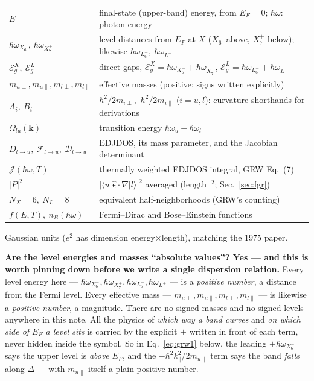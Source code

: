 \documentclass[11pt,a4paper]{article}
\numberwithin{equation}{section}
\newcommand{\hw}{\hbar\omega}
\newcommand{\EgX}{\mathcal{E}_g^{X}}
\newcommand{\EgL}{\mathcal{E}_g^{L}}
\newcommand{\cD}{\mathcal{D}}
\newcommand{\cF}{\mathcal{F}}
\newcommand{\cJ}{\mathcal{J}}%
\newcommand{\kpar}{k_{\parallel}}
\newcommand{\wXsix}{\hbar\omega_{X_6^-}}
\newcommand{\wXseven}{\hbar\omega_{X_7^+}}
\newcommand{\wLsix}{\hbar\omega_{L_6^-}}
\newcommand{\wLplus}{\hbar\omega_{L^+}}
\begin{document}
\begin{center}
\small
\begin{tabular}{ll}
\toprule
$E$ & final-state (upper-band) energy, from $E_F=0$; $\hw$: photon energy\\
$\wXsix,\ \wXseven$ & level distances from $E_F$ at $X$
  ($X_6^-$ above, $X_7^+$ below); likewise $\wLsix,\ \wLplus$\\
$\EgX,\ \EgL$ & direct gaps, $\EgX=\wXsix+\wXseven$,
  $\EgL=\wLsix+\wLplus$\\
$m_{u\perp},m_{u\parallel},m_{l\perp},m_{l\parallel}$ &
  effective masses (positive; signs written explicitly)\\
$A_i,\ B_i$ & $\hbar^2/2m_{i\perp}$,\ $\hbar^2/2m_{i\parallel}$
  ($i=u,l$): curvature shorthands for derivations\\
$\Omega_{lu}(\mathbf k)$ & transition energy
  $\hbar\omega_u-\hbar\omega_l$\\
$D_{l\to u},\ \cF_{l\to u},\ \cD_{l\to u}$ & EDJDOS, its mass
  parameter, and the Jacobian determinant\\
$\cJ(\hw,T)$ & thermally weighted EDJDOS integral, GRW Eq.~(7)\\
$|P|^2$ & $|\langle u|\hat{\bm\epsilon}\!\cdot\!\nabla|l\rangle|^2$
  averaged (length$^{-2}$; Sec.~\ref{sec:fgr})\\
$N_X=6,\ N_L=8$ & equivalent half-neighborhoods (GRW's counting)\\
$f(E,T),\ n_B(\hw)$ & Fermi--Dirac and Bose--Einstein functions\\
\bottomrule
\end{tabular}
\end{center}

\noindent Gaussian units ($e^2$ has dimension energy$\times$length),
matching the 1975 paper.

\medskip
\noindent\textbf{Are the level energies and masses ``absolute
values''? Yes --- and this is worth pinning down before we write a
single dispersion relation.} Every level energy here
--- $\wXsix,\wXseven,\wLsix,\wLplus$ --- is a \emph{positive number},
a distance from the Fermi level. Every effective mass ---
$m_{u\perp},m_{u\parallel},m_{l\perp},m_{l\parallel}$ --- is likewise
a \emph{positive number}, a magnitude. There are no signed masses and
no signed levels anywhere in this note. All the physics of
\emph{which way a band curves} and \emph{on which side of $E_F$ a
level sits} is carried by the explicit $\pm$ written in front of each
term, never hidden inside the symbol. So in Eq.~\eqref{eq:grw1}
below, the leading $+\wXsix$ says the upper level is \emph{above}
$E_F$, and the $-\hbar^2\kpar^2/2m_{u\parallel}$ term says the band
\emph{falls} along $\Delta$ --- with $m_{u\parallel}$ itself a
plain positive number.
\end{document}
